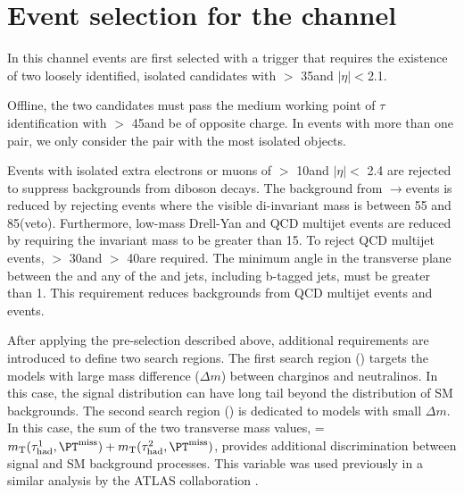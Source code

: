 \section{\texorpdfstring{Event selection for the \tauTau channel}{Event selection for the tau-tau channel}}
\label{sect:tauTauCuts}
In this channel events are first selected with a trigger \cite{Khachatryan:2015hwa,Chatrchyan:2012xi,Chatrchyan:2011nv}
that requires the existence of
two loosely identified, isolated \Tau candidates with \PT $>$ 35\GeV and $|\eta|<$2.1.   

Offline, the two \Tau candidates must pass the medium working point \cite{Khachatryan:2015dfa} of $\tau$ identification
with \PT $>$ 45\GeV and be of opposite charge.
In events with more than one \tauTau pair, we only consider the pair with the most isolated \Tau objects. 

Events with isolated extra electrons or muons of \PT $>$ 10\GeV and $|\eta| <$ 2.4 
are rejected to suppress %
backgrounds from diboson decays.
The background from \Z$\rightarrow$\tauTau events is reduced by rejecting events where the visible
di-\Tau invariant mass is between 55 and 85\GeV (\Z veto).  Furthermore, 
low-mass Drell-Yan and QCD multijet events are reduced by requiring the invariant mass to be greater than 15\GeV.
To reject QCD multijet events, %
\MPT $>$ 30\GeV and \mttwo $>$ 40\GeV are required.
The minimum angle \deltaphi in the transverse plane between the \ptvecmiss and any of the \Tau and jets, 
including b-tagged jets, must be greater than 1. 
This requirement reduces backgrounds from QCD multijet events and \wjets events.

After applying the pre-selection described above,
additional requirements are introduced to define two search regions.
The first search region (\binone) targets the models with large mass difference ($\Delta m$) 
between charginos and neutralinos.
In this case, the \mttwo signal distribution can have long tail beyond the 
distribution of SM backgrounds.
The second search region (\bintwo) is dedicated to models with small $\Delta m$.  
In this case, the sum of the two transverse mass values, \SumMT = $\mt(\Tau^1,\MPT) + \mt(\Tau^2,\MPT)$, 
provides additional discrimination between signal and SM background processes.
This variable was used previously in a similar analysis by the ATLAS collaboration \cite{Aad:2014yka}.

